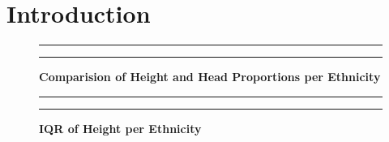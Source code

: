 \documentclass[]{article}
\begin{document}
\vskip -8.5pt




\noindent  

\section{Introduction}
\label{sec:intro}

\begin{figure}[!ht]
    \hrule
    \caption{ \textbf{Comparision of Height and Head Proportions per Ethnicity} }
    \begin{center}
    \end{center}
    \label{fig:OnePlot}
    \hrule
\end{figure}

\begin{figure}[!ht]
    \hrule
    \caption{ \textbf{IQR of Height per Ethnicity} }
    \begin{center}
    \end{center}
    \label{fig:TwoPlot}
    \hrule
\end{figure}
\end{document}
